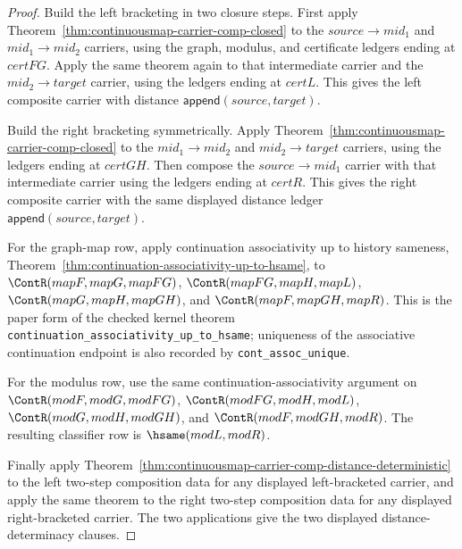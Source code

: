 \begin{proof}
Build the left bracketing in two closure steps. First apply
Theorem~\ref{thm:continuousmap-carrier-comp-closed} to the
$source \to mid_1$ and $mid_1 \to mid_2$ carriers, using the graph, modulus,
and certificate ledgers ending at $certFG$. Apply the same theorem again to
that intermediate carrier and the $mid_2 \to target$ carrier, using the
ledgers ending at $certL$. This gives the left composite carrier with distance
$\mathsf{append}(source,target)$.

Build the right bracketing symmetrically. Apply
Theorem~\ref{thm:continuousmap-carrier-comp-closed} to the
$mid_1 \to mid_2$ and $mid_2 \to target$ carriers, using the ledgers ending at
$certGH$. Then compose the $source \to mid_1$ carrier with that intermediate
carrier using the ledgers ending at $certR$. This gives the right composite
carrier with the same displayed distance ledger
$\mathsf{append}(source,target)$.

For the graph-map row, apply continuation associativity up to history
sameness, Theorem~\ref{thm:continuation-associativity-up-to-hsame}, to
$\ContR(mapF,mapG,mapFG)$, $\ContR(mapFG,mapH,mapL)$,
$\ContR(mapG,mapH,mapGH)$, and $\ContR(mapF,mapGH,mapR)$. This is the paper
form of the checked kernel theorem
\texttt{continuation\_associativity\_up\_to\_hsame}; uniqueness of the
associative continuation endpoint is also recorded by
\texttt{cont\_assoc\_unique}.

For the modulus row, use the same continuation-associativity argument on
$\ContR(modF,modG,modFG)$, $\ContR(modFG,modH,modL)$,
$\ContR(modG,modH,modGH)$, and $\ContR(modF,modGH,modR)$. The resulting
classifier row is $\hsame(modL,modR)$.

Finally apply
Theorem~\ref{thm:continuousmap-carrier-comp-distance-deterministic} to the
left two-step composition data for any displayed left-bracketed carrier, and
apply the same theorem to the right two-step composition data for any
displayed right-bracketed carrier. The two applications give the two displayed
distance-determinacy clauses.
\end{proof}

